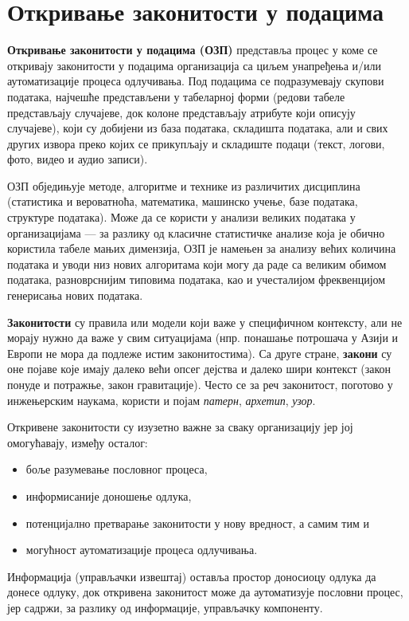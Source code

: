 
\chapter{Откривање законитости у подацима}
\label{ch:ozp}
\textbf{Откривање законитости у подацима (ОЗП)} представља процес у коме се откривају законитости у подацима организација са циљем унапређења и/или аутоматизације процеса одлучивања. Под подацима се подразумевају скупови података, најчешће представљени у табеларној форми (редови табеле представљају случајеве, док колоне представљају атрибуте који описују случајеве), који су добијени из база података, складишта података, али и свих других извора преко којих се прикупљају и складиште подаци (текст, логови, фото, видео и аудио записи).

ОЗП обједињује методе, алгоритме и технике из различитих дисциплина (статистика и вероватноћа, математика, машинско учење, базе података, структуре података). Може да се користи у анализи великих података у организацијама — за разлику од класичне статистичке анализе која је обично користила табеле мањих димензија, ОЗП је намењен за анализу већих количина података и уводи низ нових алгоритама који могу да раде са великим обимом података, разноврснијим типовима података, као и учесталијом фреквенцијом генерисања нових података.

\textbf{Законитости} су правила или модели који важе у специфичном контексту, али не морају нужно да важе у свим ситуацијама (нпр. понашање потрошача у Азији и Европи не мора да подлеже истим законитостима). Са друге стране, \textbf{закони} су оне појаве које имају далеко већи опсег дејства и далеко шири контекст (закон понуде и потражње, закон гравитације). Често се за реч законитост, поготово у инжењерским наукама, користи и појам \textit{патерн}, \textit{архетип}, \textit{узор}.

Откривене законитости су изузетно важне за сваку организацију јер јој омогућавају, између осталог:

\begin{itemize}
  \item боље разумевање пословног процеса,
  \item информисаније доношење одлука,
  \item потенцијално претварање законитости у нову вредност, а самим тим и
  \item могућност аутоматизације процеса одлучивања.
\end{itemize}
Информација (управљачки извештај) оставља простор доносиоцу одлука да донесе одлуку, док откривена законитост може да аутоматизује пословни процес, јер садржи, за разлику од информације, управљачку компоненту.

